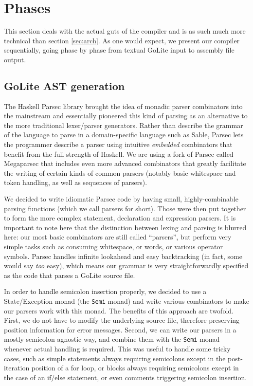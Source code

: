 \documentclass[letterpaper,11pt]{article}
\begin{document}
\section{Phases}
\label{sec:ph}

This section deals with the actual guts of the compiler and is as such much more technical than section \ref{sec:arch}. As one would expect, we present our compiler sequentially, going phase by phase from textual GoLite input to assembly file output.

\subsection{GoLite AST generation}
\label{sec:ph_parse}
The Haskell Parsec library brought the idea of monadic parser combinators into the mainstream and essentially pioneered this kind of parsing as an alternative to the more traditional lexer/parser generators. Rather than describe the grammar of the language to parse in a domain-specific language such as Sable, Parsec lets the programmer describe a parser using intuitive \emph{embedded} combinators that benefit from the full strength of Haskell. We are using a fork of Parsec called Megaparsec that includes even more advanced combinators that greatly facilitate the writing of certain kinds of common parsers (notably basic whitespace and token handling, as well as sequences of parsers).

We decided to write idiomatic Parsec code by having small, highly-combinable parsing functions (which we call parsers for short). Those were then put together to form the more complex statement, declaration and expression parsers. It is important to note here that the distinction between lexing and parsing is blurred here: our most basic combinators are still called ``parsers'', but perform very simple tasks such as consuming whitespace, or words, or various operator symbols. Parsec handles infinite lookahead and easy backtracking (in fact, some would say \emph{too} easy), which means our grammar is very straightforwardly specified as the code that parses a GoLite source file.

In order to handle semicolon insertion properly, we decided to use a State/Exception monad (the \texttt{Semi} monad) and write various combinators to make our parsers work with this monad. The benefits of this approach are twofold. First, we do not have to modify the underlying source file, therefore preserving position information for error messages. Second, we can write our parsers in a mostly semicolon-agnostic way, and combine them with the \texttt{Semi} monad whenever actual handling is required. This was useful to handle some tricky cases, such as simple statements always requiring semicolons except in the post-iteration position of a for loop, or blocks always requiring semicolons except in the case of an if/else statement, or even comments triggering semicolon insertion.
\end{document}
